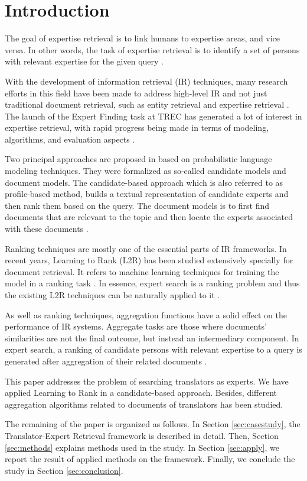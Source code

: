 \section{Introduction}
\label{sec:introduction}
The goal of expertise retrieval is to link humans to expertise areas, and vice versa. In other words, the task of expertise retrieval is to identify a set of persons with relevant expertise for the given query \cite{er} \cite{er-community-aware}.

With the development of information retrieval (IR) techniques, many research efforts in this field have been made to address high-level IR and not just traditional document retrieval, such as entity retrieval and expertise retrieval \citep{er-sparse}. The launch of the Expert Finding task at TREC has generated a lot of interest in expertise retrieval, with rapid progress being made in terms of modeling, algorithms, and evaluation aspects \cite{trec2005} \cite{er-community-aware}.

Two principal approaches are proposed in \cite{trec2005} based on probabilistic language modeling techniques. They were formalized as so-called candidate models and document models. The candidate-based approach which is also referred to as profile-based method, builds a textual representation of candidate experts and then rank them based on the query. The document models is to first find documents that are relevant to the topic and then locate the experts associated with these documents \cite{er}.

Ranking techniques are mostly one of the essential parts of IR frameworks. In recent years, Learning to Rank (L2R) has been studied extensively specially for document retrieval. It refers to machine learning techniques for training the model in a ranking task \cite{er}. In essence, expert search is a ranking problem and thus the existing L2R techniques can be naturally applied to it \cite{l2r-intro}.

As well as ranking techniques, aggregation functions have a solid effect on the performance of IR systems. Aggregate tasks are those where documents' similarities are not
the final outcome, but instead an intermediary component. In expert search, a ranking of candidate persons with relevant expertise to a query is generated after aggregation of their related documents \citep{agg-learning}.

This paper addresses the problem of searching translators as experts. We have applied Learning to Rank in a candidate-based approach. Besides, different aggregation algorithms related to documents of translators has been studied.

The remaining of the paper is organized as follows. In Section \ref{sec:casestudy}, the Translator-Expert Retrieval framework is described in detail. Then, Section \ref{sec:methods} explains methods used in the study. In Section \ref{sec:apply}, we report the result of applied methods on the framework. Finally, we conclude the study in Section \ref{sec:conclusion}.
